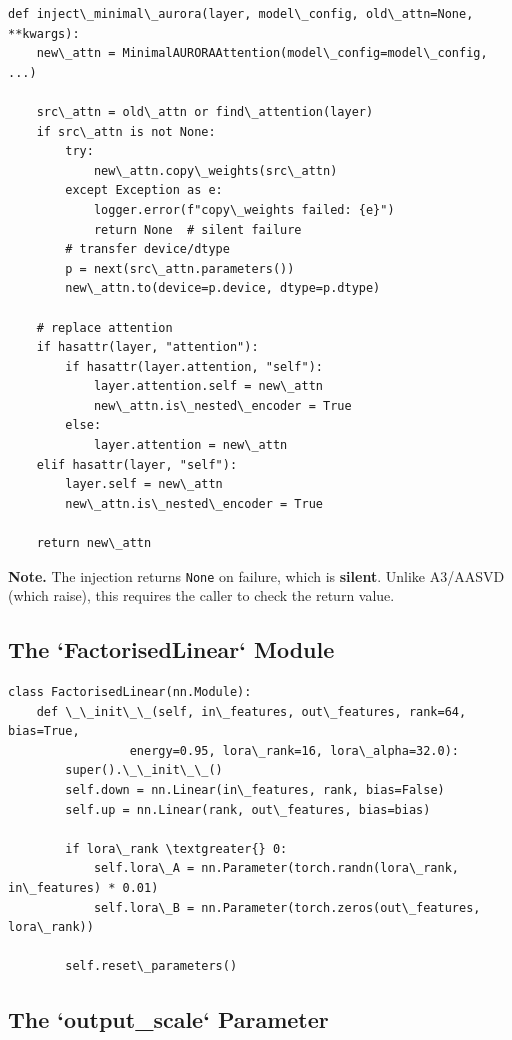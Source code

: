 \begin{lstlisting}
def inject\_minimal\_aurora(layer, model\_config, old\_attn=None, **kwargs):
    new\_attn = MinimalAURORAAttention(model\_config=model\_config, ...)
    
    src\_attn = old\_attn or find\_attention(layer)
    if src\_attn is not None:
        try:
            new\_attn.copy\_weights(src\_attn)
        except Exception as e:
            logger.error(f"copy\_weights failed: {e}")
            return None  # silent failure
        # transfer device/dtype
        p = next(src\_attn.parameters())
        new\_attn.to(device=p.device, dtype=p.dtype)
    
    # replace attention
    if hasattr(layer, "attention"):
        if hasattr(layer.attention, "self"):
            layer.attention.self = new\_attn
            new\_attn.is\_nested\_encoder = True
        else:
            layer.attention = new\_attn
    elif hasattr(layer, "self"):
        layer.self = new\_attn
        new\_attn.is\_nested\_encoder = True
    
    return new\_attn
\end{lstlisting}

\textbf{Note.} The injection returns \texttt{None} on failure, which is \textbf{silent}. 
Unlike A3/AASVD (which raise), this requires the caller to check the 
return value.

\subsection{The `FactorisedLinear` Module}

\begin{lstlisting}
class FactorisedLinear(nn.Module):
    def \_\_init\_\_(self, in\_features, out\_features, rank=64, bias=True,
                 energy=0.95, lora\_rank=16, lora\_alpha=32.0):
        super().\_\_init\_\_()
        self.down = nn.Linear(in\_features, rank, bias=False)
        self.up = nn.Linear(rank, out\_features, bias=bias)
        
        if lora\_rank \textgreater{} 0:
            self.lora\_A = nn.Parameter(torch.randn(lora\_rank, in\_features) * 0.01)
            self.lora\_B = nn.Parameter(torch.zeros(out\_features, lora\_rank))
        
        self.reset\_parameters()
\end{lstlisting}

\subsection{The `output\_scale` Parameter}

